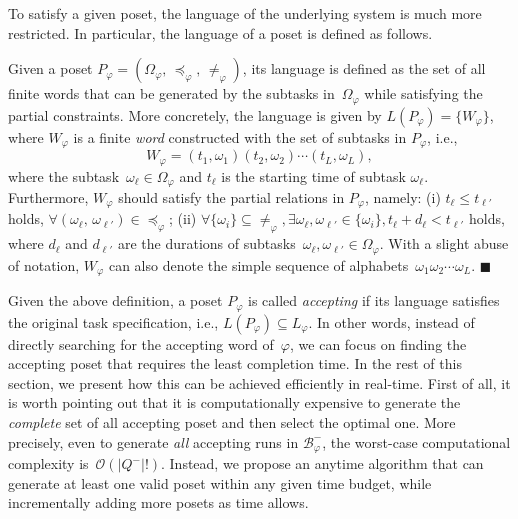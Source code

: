 To satisfy a given poset, the language of the underlying system is
much more restricted.
In particular, the language of a poset is defined as follows.

\begin{definition}\label{def:language-poset}
Given a poset $P_\varphi=(\Omega_{\varphi}, \, \preceq_{\varphi}, \, \neq_{\varphi})$,
its language is defined as the set of all finite words
that can be generated by the subtasks in~$\Omega_{\varphi}$
while satisfying the partial constraints.
More concretely, the language is given by
$L(P_\varphi)=\{W_{\varphi}\}$, where $W_{\varphi}$ is a finite
\emph{word} constructed with the set of subtasks in $P_\varphi$, i.e.,
\begin{equation}\label{eq:poset-language}
W_{\varphi}=(t_1,\omega_1) (t_2,\omega_2)\cdots (t_L,\omega_L),
\end{equation}
where the subtask~$\omega_\ell \in \Omega_\varphi$ and
$t_\ell$ is the starting time of subtask $\omega_\ell$.
Furthermore, $W_{\varphi}$ should satisfy the partial relations in $P_\varphi$, namely:
(i) $t_\ell \leq t_{\ell'}$ holds,
$\forall (\omega_\ell,\,\omega_{\ell'})\in \preceq_{\varphi}$;
(ii) $\forall \{\omega_{i}\}\subseteq \neq_{\varphi},
\exists\omega_{\ell},\omega_{\ell'}\in\{\omega_{i}\}, t_\ell + d_\ell <  t_{\ell'}$ holds,
where $d_\ell$ and $d_{\ell'}$ are the durations of
subtasks~$\omega_\ell, \omega_{\ell'} \in \Omega_{\varphi}$.
With a slight abuse of notation, $W_\varphi$ can also denote the
simple sequence of alphabets~$\omega_1\omega_2\cdots \omega_L$.
\hfill $\blacksquare$
\end{definition}

Given the above definition, a poset $P_\varphi$ is called \emph{accepting}
if its language satisfies the original task specification, i.e.,
$L(P_\varphi)\subseteq L_\varphi$.
In other words, instead of directly searching for the accepting word of~$\varphi$,
we can focus on finding the accepting poset that
requires the least completion time.
In the rest of this section, we present how this can be achieved efficiently
in real-time.
First of all, it is worth pointing out that it is computationally expensive to
generate the \emph{complete} set of all accepting poset
and then select the optimal one.
More precisely, even to generate \emph{all} accepting runs in $\mathcal{B}_{\varphi}^-$,
the worst-case computational complexity is~$\mathcal{O}(|Q^-|!)$.
Instead, we propose an anytime algorithm that can generate at least one
valid poset within any given time budget,
while incrementally adding more posets as time allows.


